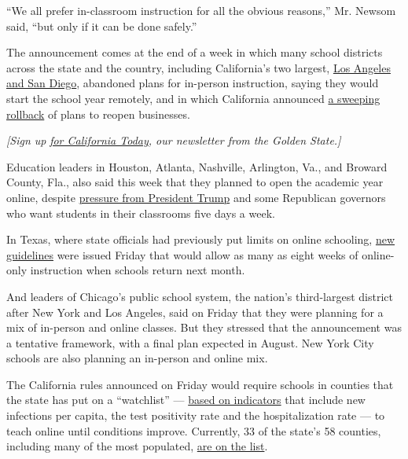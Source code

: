 ``We all prefer in-classroom instruction for all the obvious reasons,''
Mr. Newsom said, ``but only if it can be done safely.''

The announcement comes at the end of a week in which many school
districts across the state and the country, including California's two
largest,
\href{https://www.nytimes.com/2020/07/13/us/lausd-san-diego-school-reopening.html}{Los
Angeles and San Diego}, abandoned plans for in-person instruction,
saying they would start the school year remotely, and in which
California announced
\href{https://www.nytimes.com/2020/07/14/us/california-counties-reopening.html}{a
sweeping rollback} of plans to reopen businesses.

\emph{{[}Sign up}
\href{https://www.nytimes.com/newsletters/california-today}{\emph{for
California Today}}\emph{, our newsletter from the Golden State.{]}}

Education leaders in Houston, Atlanta, Nashville, Arlington, Va., and
Broward County, Fla., also said this week that they planned to open the
academic year online, despite
\href{https://www.nytimes.com/2020/07/14/us/coronavirus-schools-fall.html}{pressure
from President Trump} and some Republican governors who want students in
their classrooms five days a week.

In Texas, where state officials had previously put limits on online
schooling, \href{https://pbs.twimg.com/media/EdI6_hZWkAAG24Y.jpg}{new
guidelines} were issued Friday that would allow as many as eight weeks
of online-only instruction when schools return next month.

And leaders of Chicago's public school system, the nation's
third-largest district after New York and Los Angeles, said on Friday
that they were planning for a mix of in-person and online classes. But
they stressed that the announcement was a tentative framework, with a
final plan expected in August. New York City schools are also planning
an in-person and online mix.

The California rules announced on Friday would require schools in
counties that the state has put on a ``watchlist'' ---
\href{https://www.cdph.ca.gov/Programs/CID/DCDC/Pages/COVID-19/COVID19CountyDataTable.aspx}{based
on indicators} that include new infections per capita, the test
positivity rate and the hospitalization rate --- to teach online until
conditions improve. Currently, 33 of the state's 58 counties, including
many of the most populated,
\href{https://www.cdph.ca.gov/Programs/CID/DCDC/Pages/COVID-19/CountyMonitoringDataStep2.aspx}{are
on the list}.

